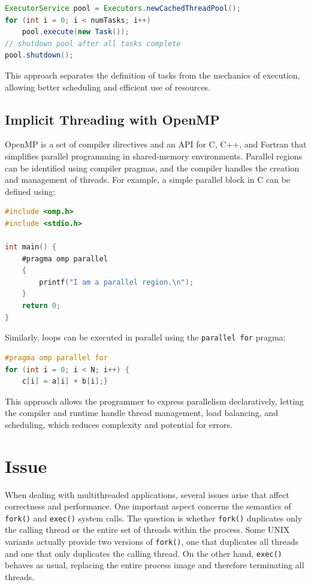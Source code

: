 \begin{lstlisting}[language=Java]
ExecutorService pool = Executors.newCachedThreadPool();
for (int i = 0; i < numTasks; i++)
    pool.execute(new Task());
// shutdown pool after all tasks complete
pool.shutdown();
\end{lstlisting}

This approach separates the definition of tasks from the mechanics of execution, allowing better scheduling and efficient use of resources.

\subsection{Implicit Threading with OpenMP}

OpenMP is a set of compiler directives and an API for C, C++, and Fortran that simplifies parallel programming in shared-memory environments. Parallel regions can be identified using compiler pragmas, and the compiler handles the creation and management of threads. For example, a simple parallel block in C can be defined using:

\begin{lstlisting}[language=C]
#include <omp.h>
#include <stdio.h>

int main() {
    #pragma omp parallel
    {
        printf("I am a parallel region.\n");
    }
    return 0;
}
\end{lstlisting}

Similarly, loops can be executed in parallel using the \texttt{parallel for} pragma:

\begin{lstlisting}[language=C]
#pragma omp parallel for
for (int i = 0; i < N; i++) {
    c[i] = a[i] + b[i];}
\end{lstlisting}

This approach allows the programmer to express parallelism declaratively, letting the compiler and runtime handle thread management, load balancing, and scheduling, which reduces complexity and potential for errors.

\section{Issue}
When dealing with multithreaded applications, several issues arise that affect correctness and performance. One important aspect concerns the semantics of \texttt{fork()} and \texttt{exec()} system calls. The question is whether \texttt{fork()} duplicates only the calling thread or the entire set of threads within the process. Some UNIX variants actually provide two versions of \texttt{fork()}, one that duplicates all threads and one that only duplicates the calling thread. On the other hand, \texttt{exec()} behaves as usual, replacing the entire process image and therefore terminating all threads.


